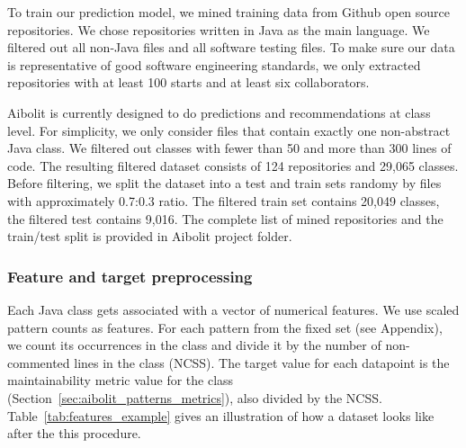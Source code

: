 \label{sec:dataset}

To train our prediction model, we mined training data
from Github open source repositories. We chose repositories written in Java
as the main language. We filtered out all non-Java files and all software
testing files. To make sure our data is
representative of good software engineering standards, we only extracted
repositories with at least 100 starts and at least six collaborators.

Aibolit is currently designed to do predictions and recommendations at class
level. For simplicity, we only consider files that contain exactly one 
non-abstract Java class.
We filtered out classes with fewer than 50 and more than 300 lines of code.
The resulting filtered dataset consists of 124 repositories and
29,065 classes. Before filtering, we split the dataset into a test and train sets randomy by files with 
approximately 0.7:0.3 ratio. The filtered train set contains 20,049 classes, 
the filtered test contains 9,016.
The complete list of mined repositories and the train/test split is provided in Aibolit
project folder. 

\subsubsection*{Feature and target preprocessing} 

Each Java class gets
associated with a vector of numerical features. We use scaled pattern counts as
features. For each pattern from the fixed set
(see Appendix), we count its occurrences in the
class and divide it by the number of non-commented lines in the class (NCSS).
The target value for each datapoint is the maintainability metric value for the
class (Section~\ref{sec:aibolit_patterns_metrics}), also divided by the NCSS.
Table~\ref{tab:features_example}
gives an illustration of how a dataset looks like after the this procedure.


%
%


